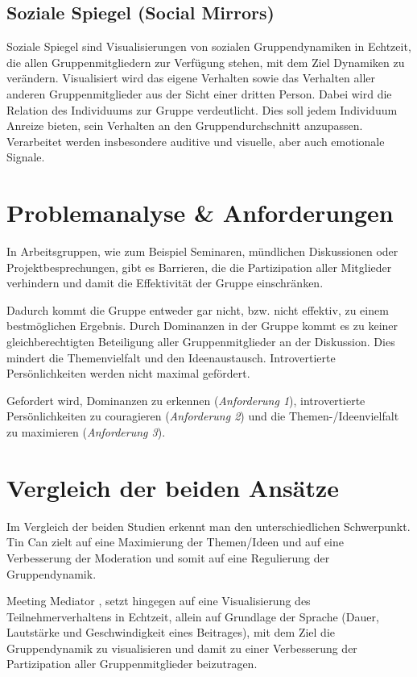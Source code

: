 \documentclass{seminarvorlage}
\begin{document}
\subsection{Soziale Spiegel (Social Mirrors)}
Soziale Spiegel \cite{BergKara2009-2} sind Visualisierungen von sozialen
Gruppendynamiken in Echtzeit, die allen Gruppenmitgliedern zur Verfügung stehen,
mit dem Ziel Dynamiken zu ver\-änd\-ern. Visualisiert wird das eigene Verhalten
sowie das Verhalten aller anderen Gruppenmitglieder aus der Sicht einer dritten
Person. Dabei wird die Relation des Individuums zur Gruppe verdeutlicht. Dies
soll jedem Individuum Anreize bieten, sein Verhalten an den Gruppendurchschnitt
anzupassen. Verarbeitet werden insbesondere auditive und visuelle, aber
auch emotionale Signale.

\section{Problemanalyse \& Anforderungen}
In Arbeitsgruppen, wie zum Beispiel Seminaren, münd\-lich\-en Diskussionen oder
Projektbesprechungen, gibt es Barrieren, die die Partizipation aller
Mitglieder verhindern und damit die Effektivität der Gruppe einschränken.

Dadurch kommt die Gruppe entweder gar nicht, bzw. nicht effektiv, zu einem
best\-mög\-lich\-en Ergebnis. Durch Dominanzen in der Gruppe kommt es zu
keiner gleichberechtigten Beteiligung aller Gruppenmitglieder an der Diskussion.
Dies mindert die Themenvielfalt und den Ideenaustausch. Introvertierte
Per\-sön\-lich\-keit\-en werden nicht maximal gefördert.

Gefordert wird, Dominanzen zu erkennen ({\em Anforderung 1}), introvertierte Per\-sön\-lich\-keit\-en
zu couragieren ({\em Anforderung 2}) und die Themen-/\-Ideen\-vielfalt zu maximieren ({\em Anforderung 3}).




\section{Vergleich der beiden Ansätze}
Im Vergleich der beiden Studien erkennt man den unterschiedlichen Schwerpunkt.
Tin Can \cite{HarGorSch2012} zielt auf eine Maximierung der Themen/Ideen und auf
eine Verbesserung der Moderation und somit auf eine Regulierung der Gruppendynamik.

Meeting Mediator \cite{KimChaHolPent2008}, setzt hingegen auf eine
Visualisierung des Teilnehmerverhaltens in Echtzeit, allein auf Grundlage der Sprache (Dauer,
Lautstärke und Geschwindigkeit eines Beitrages), mit dem Ziel die Gruppendynamik zu
visualisieren und damit zu einer Verbesserung der Partizipation aller
Gruppenmitglieder beizutragen.
\end{document}
